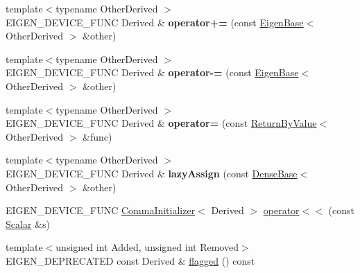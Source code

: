 \begin{DoxyCompactItemize}
\mbox{\label{class_eigen_1_1_dense_base_a8fdd498a76ab5e136e3c55b1412cd8c4}} 
{\footnotesize template$<$typename Other\+Derived $>$ }\\E\+I\+G\+E\+N\+\_\+\+D\+E\+V\+I\+C\+E\+\_\+\+F\+U\+NC Derived \& {\bfseries operator+=} (const \mbox{\hyperlink{struct_eigen_1_1_eigen_base}{Eigen\+Base}}$<$ Other\+Derived $>$ \&other)
\item 
\mbox{\label{class_eigen_1_1_dense_base_a5ce384b60166efd51356eb738f534144}} 
{\footnotesize template$<$typename Other\+Derived $>$ }\\E\+I\+G\+E\+N\+\_\+\+D\+E\+V\+I\+C\+E\+\_\+\+F\+U\+NC Derived \& {\bfseries operator-\/=} (const \mbox{\hyperlink{struct_eigen_1_1_eigen_base}{Eigen\+Base}}$<$ Other\+Derived $>$ \&other)
\item 
\mbox{\label{class_eigen_1_1_dense_base_a5ab39bb4593a4321c3dc1d1cf7133c27}} 
{\footnotesize template$<$typename Other\+Derived $>$ }\\E\+I\+G\+E\+N\+\_\+\+D\+E\+V\+I\+C\+E\+\_\+\+F\+U\+NC Derived \& {\bfseries operator=} (const \mbox{\hyperlink{class_eigen_1_1_return_by_value}{Return\+By\+Value}}$<$ Other\+Derived $>$ \&func)
\item 
\mbox{\label{class_eigen_1_1_dense_base_ac91360b0526a36067915f63bf45b8b0e}} 
{\footnotesize template$<$typename Other\+Derived $>$ }\\E\+I\+G\+E\+N\+\_\+\+D\+E\+V\+I\+C\+E\+\_\+\+F\+U\+NC Derived \& {\bfseries lazy\+Assign} (const \mbox{\hyperlink{class_eigen_1_1_dense_base}{Dense\+Base}}$<$ Other\+Derived $>$ \&other)
\item 
E\+I\+G\+E\+N\+\_\+\+D\+E\+V\+I\+C\+E\+\_\+\+F\+U\+NC \mbox{\hyperlink{struct_eigen_1_1_comma_initializer}{Comma\+Initializer}}$<$ Derived $>$ \mbox{\hyperlink{class_eigen_1_1_dense_base_a0e575eb0ba6cc6bc5f347872abd8509d}{operator$<$$<$}} (const \mbox{\hyperlink{class_eigen_1_1_dense_base_a5feed465b3a8e60c47e73ecce83e39a2}{Scalar}} \&s)
\item 
{\footnotesize template$<$unsigned int Added, unsigned int Removed$>$ }\\E\+I\+G\+E\+N\+\_\+\+D\+E\+P\+R\+E\+C\+A\+T\+ED const Derived \& \mbox{\hyperlink{class_eigen_1_1_dense_base_a9b3f75f76ae40439be870258e80c7346}{flagged}} () const
\item 

\end{DoxyCompactItemize}
